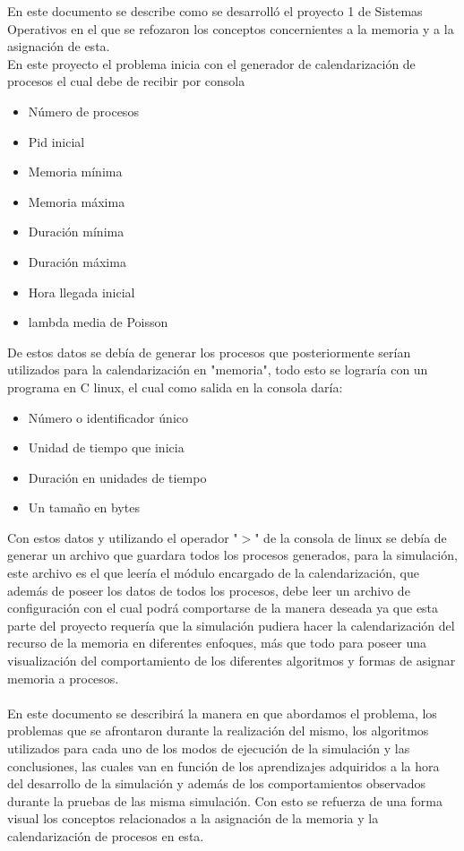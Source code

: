 \documentclass[10pt,a4paper]{article}
\begin{document}
En este documento se describe como se desarrolló el proyecto 1 de Sistemas Operativos en el que se refozaron los conceptos concernientes a la memoria y a la asignación de esta.\\ 
En este proyecto el problema inicia con el generador de calendarización de procesos el cual debe de recibir por consola 
\begin{itemize}
\item Número de procesos
\item Pid inicial
\item Memoria mínima
\item Memoria máxima
\item Duración mínima
\item Duración máxima
\item Hora llegada inicial 
\item lambda media de Poisson
\end{itemize}
De estos datos se debía de generar los procesos que posteriormente serían utilizados para la calendarización en "memoria", todo esto se lograría con un programa en C linux, el cual como salida en la consola daría:  
\begin{itemize}
\item Número o identificador único
\item Unidad de tiempo que inicia
\item Duración en unidades de tiempo
\item Un tamaño en bytes
\end{itemize}
Con estos datos y utilizando el operador "$>$" de la consola de linux se debía de generar un archivo que guardara todos los procesos generados, para la simulación, este archivo es el que leería el módulo encargado de la calendarización, que además de poseer los datos de todos los procesos, debe leer un archivo de configuración con el cual podrá comportarse de la manera deseada ya que esta parte del proyecto requería que la simulación pudiera hacer la calendarización del recurso de la memoria en diferentes enfoques, más que todo para poseer una visualización del comportamiento de los diferentes algoritmos y formas de asignar memoria a procesos.\\\\
En este documento se describirá la manera en que abordamos el problema, los problemas que se afrontaron durante la realización del mismo, los algoritmos utilizados para cada uno de los modos de ejecución de la simulación y las conclusiones, las cuales van en función de los aprendizajes adquiridos a la hora del desarrollo de la simulación y además de los comportamientos observados durante la pruebas de las misma simulación.
Con esto se refuerza de una forma visual los conceptos relacionados a la asignación de la memoria y la calendarización de procesos en esta.\\
\pagebreak
\end{document}
